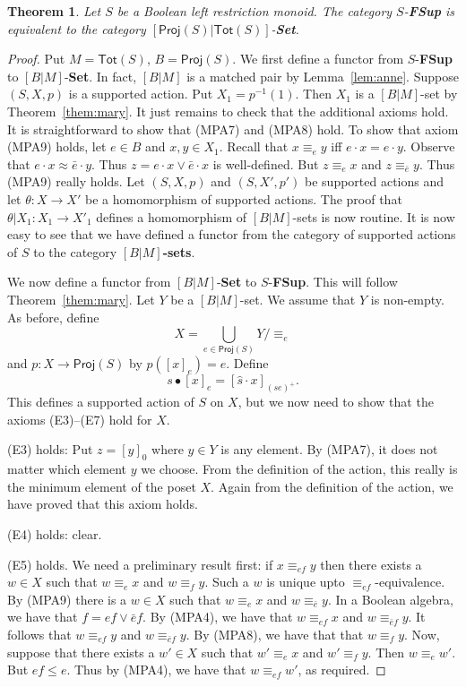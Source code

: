 \documentclass[a4paper]{amsart}
\newtheorem{theorem}{Theorem}[section]
\begin{document}
\begin{theorem}\label{them:marytwo} Let $S$ be a Boolean left restriction monoid.  
The category $S$-{\bf FSup} is equivalent to the category $[\mathsf{Proj}(S)|\mathsf{Tot}(S)]$-{\bf Set}.
\end{theorem}
\begin{proof} Put $M = \mathsf{Tot}(S)$, $B = \mathsf{Proj}(S)$. 
We first define a functor from $S$-{\bf FSup} to $[B|M]$-{\bf Set}.
In fact, $[B|M]$ is a matched pair by Lemma~\ref{lem:anne}.
Suppose $(S,X,p)$ is a supported action.
Put $X_{1} = p^{-1}(1)$.
Then $X_{1}$ is a $[B|M]$-set by Theorem~\ref{them:mary}.
It just remains to check that the additional axioms hold.
It is straightforward to show that (MPA7) and (MPA8) hold.
To show that axiom (MPA9) holds,
let $e \in B$ and $x,y \in X_{1}$.
Recall that $x \equiv_{e} y$ iff $e \cdot x = e \cdot y$.
Observe that
$e \cdot x \approx \bar{e} \cdot y$.
Thus $z = e \cdot x \vee \bar{e} \cdot x$ is well-defined.
But $z \equiv_{e} x$ and $z \equiv_{\bar{e}} y$.
Thus (MPA9) really holds.
Let $(S,X,p)$ and $(S,X',p')$ be supported actions
and
let $\theta \colon X \rightarrow X'$ be a homomorphism of supported actions.
The proof that $\theta | X_{1} \colon X_{1} \rightarrow X'_{1}$ defines a homomorphism of $[B|M]$-sets
is now routine.
It is now easy to see that we have defined a functor from the category of supported actions of $S$
to the category {\bf $[B|M]$-sets}.

We now define a functor from $[B|M]$-{\bf Set} to  $S$-{\bf FSup}.
This will follow Theorem~\ref{them:mary}.
Let $Y$ be a $[B|M]$-set.
We assume that $Y$ is non-empty.
As before, 
define
$$X = \bigcup_{e \in \mathsf{Proj}(S)} Y/\equiv_{e}$$
and
$p \colon X \rightarrow \mathsf{Proj}(S)$
by $p([x]_{e}) = e$.
Define 
$$s \bullet [x]_{e} = [\hat{s} \cdot x]_{(se)^{+}}.$$
This defines a supported action of $S$ on $X$, but we now need to show that the axioms
(E3)--(E7) hold for $X$.

(E3) holds: 
Put $z = [y]_{0}$ where $y \in Y$ is any element.
By (MPA7), it does not matter which element $y$ we choose.
From the definition of the action, this really is the minimum element of the poset $X$.
Again from the definition of the action, we have proved that this axiom holds.

(E4) holds: clear.

(E5) holds.
We need a preliminary result first:
if $x \equiv_{ef} y$ then there exists a $w \in X$ such that
$w \equiv_{e} x$ and $w \equiv_{f} y$.
Such a $w$ is unique upto $\equiv_{ef}$-equivalence.
By (MPA9)
there is a $w \in X$ such that $w \equiv_{e} x$ and $w \equiv_{\bar{e}} y$.
In a Boolean algebra, we have that $f = ef \vee \bar{e}f$.
By (MPA4),
we have that $w \equiv_{ef} x$ and $w \equiv_{\bar{e}f} y$. 
It follows that $w \equiv_{ef} y$ and $w \equiv_{\bar{e}f} y$.
By (MPA8), we have that that $w \equiv_{f} y$.
Now, suppose that there exists a $w' \in X$ such that
$w' \equiv_{e} x$ and $w' \equiv_{f} y$.
Then $w \equiv_{e} w'$.
But $ef \leq e$.
Thus by (MPA4),
we have that  $w \equiv_{ef} w'$, as required.


\end{proof}
\end{document}
